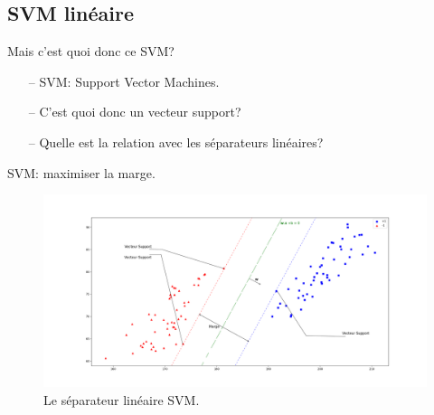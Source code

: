 \documentclass[9pt]{beamer}
\begin{document}
	\subsection[linear]{SVM linéaire}
	\begin{frame}{Mais c'est quoi donc ce SVM?}
		\begin{itemize}
			\item[--] SVM\@: Support Vector Machines.
			\item[--] C'est quoi donc un vecteur support?
			\item[--] Quelle est la relation avec les séparateurs linéaires?
		\end{itemize}
	\end{frame}

	\begin{frame}{SVM\@: maximiser la marge.}
		\begin{figure}[H]
			\includegraphics[width=\textwidth]{svm}
			\caption{\label{fig::svm} Le séparateur linéaire SVM.}
		\end{figure}
	\end{frame}
\end{document}
